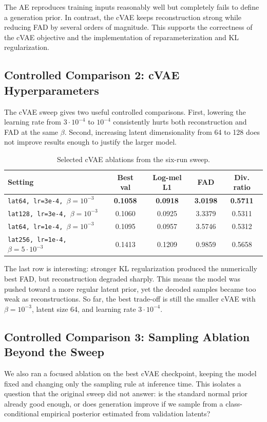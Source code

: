 \documentclass[10pt]{article}
\begin{document}
The AE reproduces training inputs reasonably well but completely fails to define a generation prior.
In contrast, the cVAE keeps reconstruction strong while reducing FAD by several orders of magnitude.
This supports the correctness of the cVAE objective and the implementation of reparameterization and KL regularization.

\subsection{Controlled Comparison 2: cVAE Hyperparameters}
The cVAE sweep gives two useful controlled comparisons.
First, lowering the learning rate from \(3\cdot 10^{-4}\) to \(10^{-4}\) consistently hurts both reconstruction and FAD at the same \(\beta\).
Second, increasing latent dimensionality from 64 to 128 does not improve results enough to justify the larger model.

\begin{table}[h]
\centering
\caption{Selected cVAE ablations from the six-run sweep.}
\label{tab:cvae_ablation}
\begin{tabular}{lcccc}
\toprule
Setting & Best val & Log-mel L1 & FAD & Div. ratio \\
\midrule
\texttt{lat64, lr=3e-4, \(\beta=10^{-3}\)} & \textbf{0.1058} & \textbf{0.0918} & \textbf{3.0198} & \textbf{0.5711} \\
\texttt{lat128, lr=3e-4, \(\beta=10^{-3}\)} & 0.1060 & 0.0925 & 3.3379 & 0.5311 \\
\texttt{lat64, lr=1e-4, \(\beta=10^{-3}\)} & 0.1095 & 0.0957 & 3.5746 & 0.5312 \\
\texttt{lat256, lr=1e-4, \(\beta=5\cdot 10^{-3}\)} & 0.1413 & 0.1209 & 0.9859 & 0.5658 \\
\bottomrule
\end{tabular}
\end{table}

The last row is interesting: stronger KL regularization produced the numerically best FAD, but reconstruction degraded sharply.
This means the model was pushed toward a more regular latent prior, yet the decoded samples became too weak as reconstructions.
So far, the best trade-off is still the smaller cVAE with \(\beta=10^{-3}\), latent size 64, and learning rate \(3\cdot 10^{-4}\).

\subsection{Controlled Comparison 3: Sampling Ablation Beyond the Sweep}
We also ran a focused ablation on the best cVAE checkpoint, keeping the model fixed and changing only the sampling rule at inference time.
This isolates a question that the original sweep did not answer: is the standard normal prior already good enough, or does generation improve if we sample from a class-conditional empirical posterior estimated from validation latents?
\end{document}
